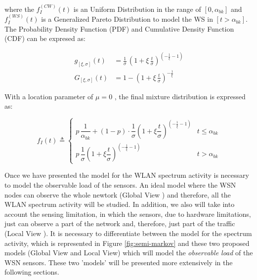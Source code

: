 where the ${f^{(CW)}_I(t)}$ is an Uniform Distribution in the range of ${[0, \alpha_{bk}]}$ and ${f^{(WS)}_I(t)}$ is a Generalized Pareto Distribution to model the \acs{WS} in $[t > \alpha_{bk}]$. The Probability Density Function (\acs{PDF}) and Cumulative Density Function (\acs{CDF}) can be expresed as:

\begin{subequations}
\begin{align}
	g_{[\xi, \sigma]}(t) &= \frac{1}{\sigma} \, \left(1 + \xi \, \frac{t}{\sigma} \right)^{( -\frac{1}{\xi} - 1)} \label{eq:pareto_pdf} \\
	G_{[\xi, \sigma]}(t) &= 1 - \left(1 + \xi \, \frac{t}{\sigma} \right)^{-\frac{1}{\xi}} \label{eq:pareto_cdf}
\end{align}
\end{subequations}

With a location parameter of ${\mu = 0}$ \cite{marcello}, the final mixture distribution is expressed as:

\begin{equation}
	\label{eqn:global_view}
	f_I(t) \triangleq
	\begin{cases}
		p \, \dfrac{1}{\alpha_{bk}} +
		(1 - p) \cdot \dfrac{1}{\sigma}\left(1 + \xi \dfrac{t}{\sigma} \right)^{\left(-\frac{1}{\xi} - 1\right)}
		  & t \le \alpha_{bk} \\
		p \, \dfrac{1}{\sigma}\left(1 + \xi \dfrac{t}{\sigma} \right)^{\left(-\frac{1}{\xi} - 1\right)}
		  & t > \alpha_{bk}
	\end{cases}
\end{equation}

Once we have presented the model for the \acs{WLAN} spectrum activity is necessary to model the observable load of the sensors. An ideal model where the \acs{WSN} nodes can observe the whole newtork (Global View \cite{marcello}) and therefore, all the \acs{WLAN} spectrum activity will be studied. In addition, we also will take into account the sensing limitation, in which the sensors, due to hardware limitations, just can observe a part of the network and, therefore, just part of the traffic (Local View \cite{marcello}). It is necessary to differentiate between the model for the spectrum activity, which is represented in Figure \ref{fig:semi-markov} and these two proposed models (Global View and Local View) which will model the \textit{observable load} of the \acs{WSN} sensors. These two 'models' will be presented more extensively in the following sections.